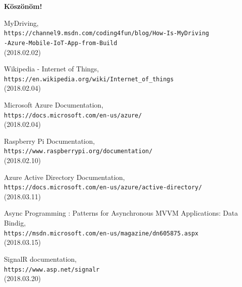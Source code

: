 \documentclass[a4paper,12pt]{report}
\begin{document}
    \textbf{Köszönöm!}
\begin{thebibliography}{9}

    MyDriving,
    \\\texttt{https://channel9.msdn.com/coding4fun/blog/How-Is-MyDriving\\-Azure-Mobile-IoT-App-from-Build}\\
    (2018.02.02)

    Wikipedia - Internet of Things,
    \\\texttt{https://en.wikipedia.org/wiki/Internet\_of\_things}\\
    (2018.02.04)

    Microsoft Azure Documentation,
    \\\texttt{https://docs.microsoft.com/en-us/azure/}\\
    (2018.02.04)

    Raspberry Pi Documentation,
    \\\texttt{https://www.raspberrypi.org/documentation/}\\
    (2018.02.10)

    Azure Active Directory Documentation,
    \\\texttt{https://docs.microsoft.com/en-us/azure/active-directory/}\\
    (2018.03.11)

    Async Programming : Patterns for Asynchronous MVVM Applications: Data Bindig,
    \\\texttt{https://msdn.microsoft.com/en-us/magazine/dn605875.aspx}\\
    (2018.03.15)

    SignalR documentation,
    \\\texttt{https://www.asp.net/signalr}\\
    (2018.03.20)

\end{thebibliography}
\end{document}
